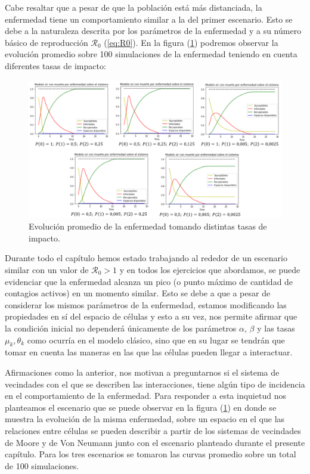 Cabe resaltar que a pesar de que la población está más distanciada, la enfermedad tiene un comportamiento similar a la del primer escenario. Esto se debe a la naturaleza descrita por los parámetros de la enfermedad y a su número básico de reproducción $\mathcal{R}_0$ (\ref{eq:R0}). En la figura (\ref{fig:comparacionTasasdeImpacto}) podremos observar la evolución promedio sobre 100 simulaciones de la enfermedad teniendo en cuenta diferentes tasas de impacto:

\begin{figure}[h]
  \centering
    \includegraphics[width=1.05\textwidth]{Imagenes/comparacionTasasImpacto.PNG}
    \caption{Evolución promedio de la enfermedad tomando distintas tasas de impacto.}
    \label{fig:comparacionTasasdeImpacto}
\end{figure}

Durante todo el capítulo hemos estado trabajando al rededor de un escenario similar con un valor de $\mathcal{R}_0>1$ y en todos los ejercicios que abordamos, se puede evidenciar que la enfermedad alcanza un pico (o punto máximo de cantidad de contagios activos) en un momento similar. Esto se debe a que a pesar de considerar los mismos parámetros de la enfermedad, estamos modificando las propiedades en sí del espacio de células y esto a su vez, nos permite afirmar que la condición inicial no dependerá únicamente de los parámetros $\alpha$, $\beta$ y las tasas $\mu_k, \theta_k$ como ocurría en el modelo clásico, sino que en su lugar se tendrán que tomar en cuenta las maneras en las que las células pueden llegar a interactuar.

Afirmaciones como la anterior, nos motivan a preguntarnos si el sistema de vecindades con el que se describen las interacciones, tiene algún tipo de incidencia en el comportamiento de la enfermedad. Para responder a esta inquietud nos planteamos el escenario que se puede observar en la figura (\ref{fig:comparacionTasasdeImpacto}) en donde se muestra la evolución de la misma enfermedad, sobre un espacio en el que las relaciones entre células se pueden describir a partir de los sistemas de vecindades de Moore y de Von Neumann junto con el escenario planteado durante el presente capítulo. Para los tres escenarios se tomaron las curvas promedio sobre un total de 100 simulaciones.

